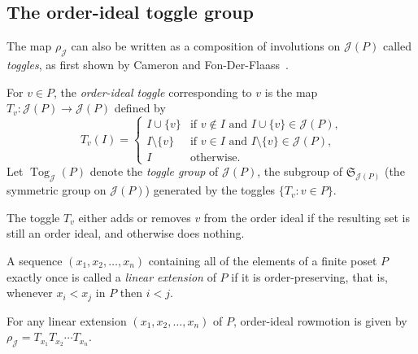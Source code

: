 \documentclass[ALCO,ThmDefs,Unicode,epreuves]{cedram}
\newcommand{\defn}[1]{\emph{#1}}
\newcommand{\ra}{\rightarrow}
\newcommand{\sm}{\setminus}
\DeclareMathOperator{\tog}{Tog}
\newcommand{\calj}{\mathcal{J}}
\newcommand\rowm{\rho}
\newcommand\rowJ{\rowm_{\mathcal{J}}}
\begin{document}
\subsection{The order-ideal toggle group}
The map $\rowJ$ can also be written as a composition of involutions on $\calj (P)$ called
\emph{toggles}, as first shown by Cameron and Fon-Der-Flaass~\cite{cameronfonder}. 


\begin{defi}\label{def:comb-row}
For $v\in P$, the \defn{order-ideal toggle} corresponding to $v$ is the map
$T_v: \calj(P)\ra \calj(P)$
defined by
\[
T_v(I)=\begin{cases}
I\cup\{v\} &\text{if $v\not\in I$ and $I\cup\{v\}\in \calj(P)$,}\\
I\sm\{v\} &\text{if $v\in I$ and $I\sm\{v\}\in \calj(P)$,}\\
I &\text{otherwise.}
\end{cases}
\]
Let $\tog_\calj(P)$ denote the \defn{toggle group} of $\calj(P)$, \ie the subgroup of
$\mathfrak{S}_{\calj (P)}$ (the symmetric group on $\calj (P)$) generated by the toggles $\{T_v : v\in P\}$.
\end{defi}

The toggle $T_v$ either adds or removes $v$ from the order ideal if the resulting set is still an order ideal, and otherwise does nothing.

\begin{defi}[{\cite[\S~3.5]{ec1ed2}}]
A sequence $(x_1,x_2,\dots,x_n)$ containing all of the elements of a finite poset $P$ exactly once is called a \defn{linear extension} of $P$ if it is order-preserving, that is, whenever $x_i<x_j$ in $P$ then $i<j$.
\end{defi}

\begin{prop}\label{prop:row-toggles}
For any linear extension $(x_1,x_2,\dots,x_n)$ of $P$, order-ideal rowmotion is given
by $\rowJ = T_{x_1} T_{x_2} \cdots T_{x_n}$.
\end{prop}
\end{document}
